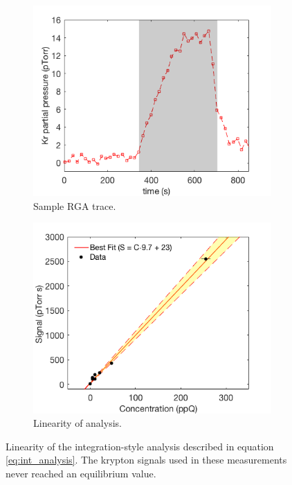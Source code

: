 \documentclass[12pt]{article}
\begin{document}
\begin{figure}[h!]
\centering
\begin{subfigure}{0.5\textwidth}
  \centering
  \includegraphics[width=\textwidth]{Figures/RGATrace_int.png}
  \caption{Sample RGA trace.}
\end{subfigure}%
\begin{subfigure}{0.5\textwidth}
  \centering
  \includegraphics[width=\textwidth]{Figures/LinPlot0217.png}
  \caption{Linearity of analysis.}
\end{subfigure}
\caption{Linearity of the integration-style analysis described in equation \ref{eq:int_analysis}. The krypton signals used in these measurements never reached an equilibrium value.}
\label{fig:linplot}
\end{figure}
\end{document}
